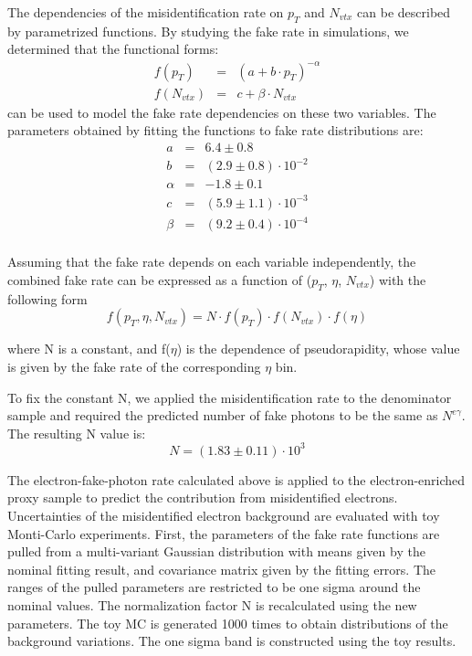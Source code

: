 \documentclass[thesis.tex]{subfiles}
\renewcommand\_{\textunderscore\allowbreak}
\begin{document}
The dependencies of the misidentification rate on $p_T$ and $N_{vtx}$ can be described by parametrized functions. By studying the fake rate in simulations, we determined that the functional forms: 
\begin{eqnarray*}
	f(p_{T})   &=& ( a + b\cdot p_T)^{-\alpha} \\
	f(N_{vtx}) &=& c + \beta \cdot N_{vtx}
\end{eqnarray*}
can be used to model the fake rate dependencies on these two variables. The parameters obtained by fitting the functions to fake rate distributions are: 
\begin{eqnarray*}
	a   &=& 6.4 \pm 0.8  \\
	b   &=& (2.9 \pm 0.8) \cdot 10^{-2} \\
	\alpha &=& -1.8 \pm 0.1 \\
	c &=& (5.9 \pm 1.1) \cdot 10^{-3} \\
	\beta &=& (9.2 \pm 0.4) \cdot 10^{-4} \\
\end{eqnarray*}

 Assuming that the fake rate depends on each variable independently, the combined fake rate can be expressed as a function of ($p_T$, $\eta$, $N_{vtx}$) with the following form 
\begin{equation} 
	f(p_{T}, \eta, N_{vtx}) = N \cdot f(p_T) \cdot f(N_{vtx}) \cdot f(\eta)
\end{equation}

where N is a constant, and f($\eta$) is the dependence of pseudorapidity, whose value is given by the fake rate of the corresponding $\eta$ bin. 

To fix the constant N, we applied the misidentification rate to the denominator sample and required the predicted number of fake photons to be the same as $N^{e\gamma}$. The resulting N value is: 
\begin{equation} 
	N = (1.83 \pm 0.11) \cdot 10^{3}
\end{equation}


The electron-fake-photon rate calculated above is applied to the electron-enriched proxy sample to predict the contribution from misidentified electrons. Uncertainties of the misidentified electron background are evaluated with toy Monti-Carlo experiments. First, the parameters of the fake rate functions are pulled from a multi-variant Gaussian distribution with means given by the nominal fitting result, and covariance matrix given by the fitting errors. The ranges of the pulled parameters are restricted to be one sigma around the nominal values. The normalization factor N is recalculated using the new parameters. The toy MC is generated 1000 times to obtain distributions of the background variations. The one sigma band is constructed using the toy results.
\end{document}
